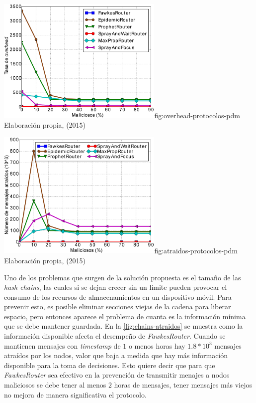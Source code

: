 {\includegraphics[width=0.6\textwidth]{imagenes/seguridad/graficos/overhead_pdm_todos.eps}}{fig:overhead-protocolos-pdm}
{Elaboración propia, (2015)}

{\includegraphics[width=0.6\textwidth]{imagenes/seguridad/graficos/atraidos_pdm_todos.eps}}{fig:atraidos-protocolos-pdm}
{Elaboración propia, (2015)}



Uno de los problemas que surgen de la solución propuesta es el tamaño de las
\textit{hash chains}, las cuales si se dejan crecer sin un límite pueden
provocar el consumo de los recursos de almacenamientos en un dispositivo móvil.
Para prevenir esto, es posible eliminar secciones viejas de la cadena para
liberar espacio, pero entonces aparece el problema de cuanta es la información
mínima que se debe mantener guardada. En la \ref{fig:chains-atraidos} se muestra
como la información disponible afecta el desempeño de \textit{FawkesRouter}.
Cuando se mantienen mensajes con \textit{timestamp} de $1$ o menos horas hay
$1.8*10^3$ mensajes atraídos por los nodos, valor que baja a medida que hay más
información disponible para la toma de decisiones. Esto quiere decir que para
que \textit{FawkesRouter} sea efectivo en la prevención de transmitir menajes a
nodos maliciosos se debe tener al menos $2$ horas de mensajes, tener mensajes
más viejos no mejora de manera significativa el protocolo.

